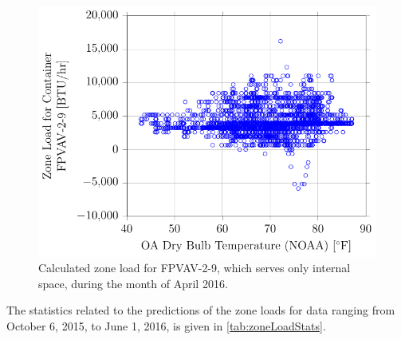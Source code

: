 \begin{figure}
\centering
\includegraphics[]{Plots/2016-06-22-1716-ZoneLoadforContainerFPVAV29vsOADryBulbTemperatureNOAA.pdf}
\caption{Calculated zone load for FPVAV-2-9, which serves only internal space, during the month of April 2016.}
\label{fig:ZoneLoadforContainerFPVAV29vsOADryBulbTemperatureNOAA}
\end{figure}


The statistics related to the predictions of the zone loads for data ranging
from October 6, 2015, to June 1, 2016, is given in \tableref{}
\ref{tab:zoneLoadStats}.


